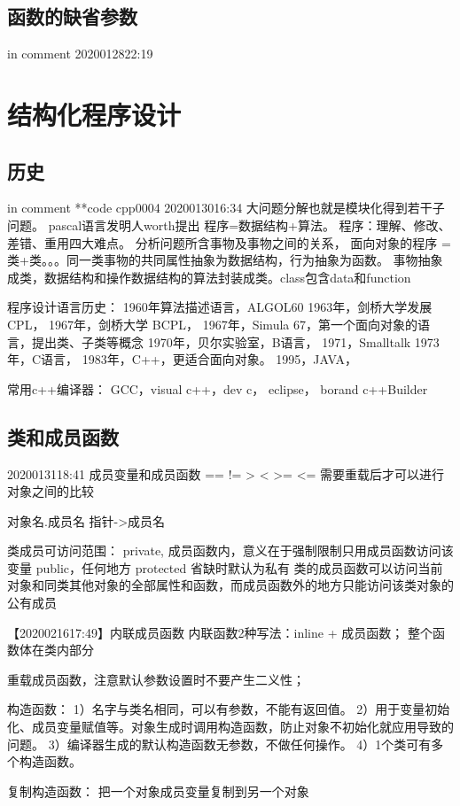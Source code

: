 \documentclass[UTF8]{article}
\begin{document}
\subsection{函数的缺省参数}
in comment
2020012822:19
\begin{comment}
最右边的若干连续参数可以缺省
void func(int x1, int x2 = 2, int x3 = 3){}
用处在于函数添加新参数时不需要修改原来不用新参数的对函数的调用。比如说原来写的单色的绘图函数加上可选颜色的属性。

\end{comment}



\section{结构化程序设计}
\subsection{历史}
in comment
**code cpp0004
2020013016:34
大问题分解也就是模块化得到若干子问题。
pascal语言发明人worth提出 程序=数据结构+算法。
程序：理解、修改、差错、重用四大难点。
分析问题所含事物及事物之间的关系，
面向对象的程序 = 类+类。。。同一类事物的共同属性抽象为数据结构，行为抽象为函数。
事物抽象成类，数据结构和操作数据结构的算法封装成类。class包含data和function



程序设计语言历史：
1960年算法描述语言，ALGOL60
1963年，剑桥大学发展 CPL，
1967年，剑桥大学 BCPL，
1967年，Simula 67，第一个面向对象的语言，提出类、子类等概念
1970年，贝尔实验室，B语言，
1971，Smalltalk
1973年，C语言，
1983年，C++，更适合面向对象。
1995，JAVA，


常用c++编译器：
GCC，visual c++，dev c， eclipse， borand c++Builder


\subsection{类和成员函数}
2020013118:41
成员变量和成员函数
== != > < >= <= 需要重载后才可以进行对象之间的比较

对象名.成员名
指针->成员名


类成员可访问范围：
private, 成员函数内，意义在于强制限制只用成员函数访问该变量
public，任何地方
protected
省缺时默认为私有
类的成员函数可以访问当前对象和同类其他对象的全部属性和函数，而成员函数外的地方只能访问该类对象的公有成员

【2020021617:49】内联成员函数
内联函数2种写法：inline + 成员函数； 整个函数体在类内部分

重载成员函数，注意默认参数设置时不要产生二义性；


构造函数：
1）名字与类名相同，可以有参数，不能有返回值。
2）用于变量初始化、成员变量赋值等。对象生成时调用构造函数，防止对象不初始化就应用导致的问题。
3）编译器生成的默认构造函数无参数，不做任何操作。
4）1个类可有多个构造函数。

复制构造函数：
把一个对象成员变量复制到另一个对象




\subsection{}







\begin{comment}

\end{comment}
\end{document}
